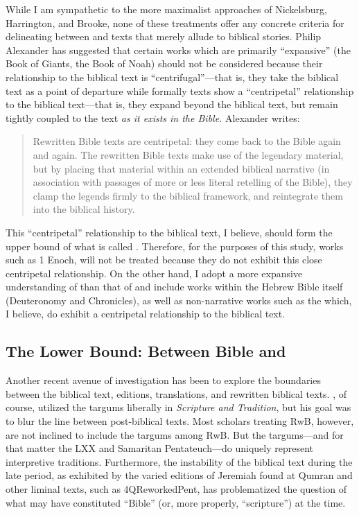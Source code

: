  While I am sympathetic to the more maximalist approaches of Nickelsburg, Harrington, and Brooke, none of these treatments offer any concrete criteria for delineating between \rwb and texts that merely allude to biblical stories. Philip Alexander has suggested that certain works which are primarily ``expansive'' (the Book of Giants, the Book of Noah) should not be considered \rwb because their relationship to the biblical text is ``centrifugal''---that is, they take the biblical text as a point of departure while formally \rwb texts show a ``centripetal'' relationship to the biblical text---that is, they expand beyond the biblical text, but remain tightly coupled to the text \emph{as it exists in the Bible.} Alexander writes: 

 \begin{quote} Rewritten Bible texts are centripetal: they come back to the Bible again and again. The rewritten Bible texts make use of the legendary material, but by placing that material within an extended biblical narrative (in association with passages of more or less literal retelling of the Bible), they clamp the legends firmly to the biblical framework, and reintegrate them into the biblical history. \autocite[117]{alexander_carson-williamson1988} \end{quote} 

 This ``centripetal'' relationship to the biblical text, I believe, should form the upper bound of what is called \rwb. Therefore, for the purposes of this study, works such as 1 Enoch, will not be treated because they do not exhibit this close centripetal relationship. On the other hand, I adopt a more expansive understanding of \rwb than that of \vermes and include works within the Hebrew Bible itself (Deuteronomy and Chronicles), as well as non-narrative works such as the \templescroll which, I believe, do exhibit a centripetal relationship to the biblical text. 

 \hypertarget{the-lower-bound-between-bible-and-rwb}{%
\subsection{The Lower Bound: Between Bible and \RWB}\label{the-lower-bound-between-bible-and-rwb}} 

 Another recent avenue of investigation has been to explore the boundaries between the biblical text, editions, translations, and rewritten biblical texts. \vermes, of course, utilized the targums liberally in \emph{Scripture and Tradition}, but his goal was to blur the line between post-biblical texts. Most scholars treating RwB, however, are not inclined to include the targums among RwB. But the targums---and for that matter the LXX and Samaritan Pentateuch---do uniquely represent interpretive traditions. Furthermore, the instability of the biblical text during the late \secondtemple period, as exhibited by the varied editions of Jeremiah found at Qumran and other liminal texts, such as 4QReworkedPent, has problematized the question of what may have constituted ``Bible'' (or, more properly, ``scripture'') at the time. 

